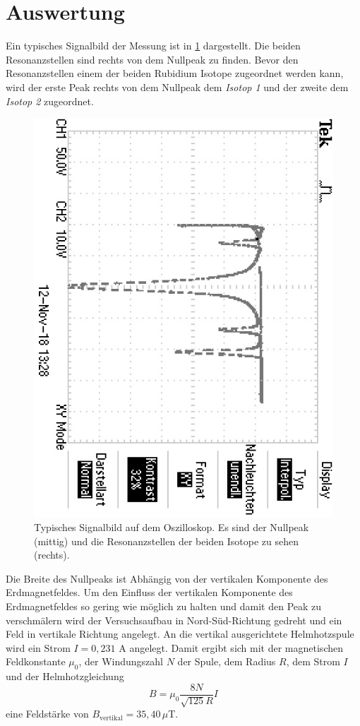 \section{Auswertung}
\label{sec:Auswertung}
Ein typisches Signalbild der Messung ist in \ref{fig:Signal} dargestellt. Die beiden
Resonanzstellen sind rechts von dem Nullpeak zu finden. Bevor den Resonanzstellen einem
der beiden Rubidium Isotope zugeordnet werden kann, wird der erste Peak rechts von dem Nullpeak
dem \textit{Isotop 1} und der zweite dem  \textit{Isotop 2} zugeordnet.
\begin{figure}
  \centering
  \includegraphics[angle=90]{pics/TEK0000.JPG}
  \caption{Typisches Signalbild auf dem Oszilloskop. Es sind der Nullpeak (mittig) und
           die Resonanzstellen der beiden Isotope zu sehen (rechts).}
  \label{fig:Signal}
\end{figure}
Die Breite des Nullpeaks ist Abhängig von der vertikalen Komponente des Erdmagnetfeldes.
Um den Einfluss der vertikalen Komponente des Erdmagnetfeldes so gering wie möglich zu halten
und damit den Peak zu verschmälern wird der Versuchsaufbau in Nord-Süd-Richtung gedreht und ein
Feld in vertikale Richtung angelegt.
An die vertikal ausgerichtete Helmhotzspule wird ein Strom $I= 0,231$ A angelegt. Damit
ergibt sich mit der magnetischen Feldkonstante $\mu_{0}$, der Windungszahl $N$ der Spule,
dem Radius $R$, dem Strom $I$ und der Helmhotzgleichung
\begin{equation}
  B=\mu_{0}\frac{8 N }{\sqrt{125} R}I
  \label{eq:Helmholz}
\end{equation} eine Feldstärke von $B_{\text{vertikal}}=35,40\,\mu$T.

